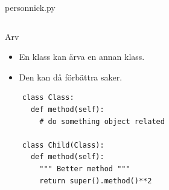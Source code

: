\begin{frame}[fragile]
  person\textunderscore nick.py \hrulefill
  \inputminted[linenos,firstline=32]{python}{examples/person_nick.py}
\end{frame}

\begin{frame}[fragile]
  \begin{block}{Arv}
    \begin{itemize}
      \item En klass kan ärva en annan klass.
      \item Den kan då förbättra saker.
    \end{itemize}
  \end{block}

  \begin{verbatim}
    class Class:
      def method(self):
        # do something object related

    class Child(Class):
      def method(self):
        """ Better method """
        return super().method()**2
  \end{verbatim}
\end{frame}

